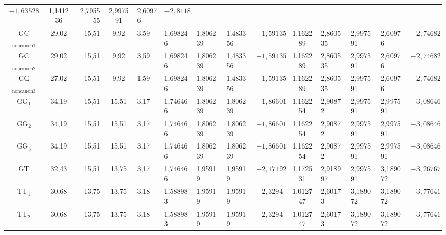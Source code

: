 \begin{table}
{\begin{sideways}
\begin{tabular}{|c|c|r|c|l|l|l|l|l|c|l|l|l|l|}
$-1{,}63528$&1,141236&2,795555&2,997591&2,60976&$-2{,}8118$\\


GC$_{\mathrm{noncanon1}}$&29,02&15,51&\hphantom{9}9,92&3,59&1,698246&1,806239&1,483356&


$-1{,}59135$&1,162289&2,860535&2,997591&2,60976&$-2{,}74682$\\


GC$_{\mathrm{noncanon2}}$&29,02&15,51&\hphantom{9}9,92&3,59&1,698246&1,806239&1,483356&


$-1{,}59135$&1,162289&2,860535&2,997591&2,60976&$-2{,}74682$\\


GС$_{\mathrm{noncanon3}}$&27,02&15,51&\hphantom{9}9,92&1,59&1,698246&1,806239&1,483356&


$-1{,}59135$&1,162289&2,860535&2,997591&2,60976&$-2{,}74682$\\


GG$_1$&34,19&15,51&15,51&3,17&1,746466&1,806239&1,806239&


$-1{,}86601$&1,162254&2,90872&2,997591&2,997591&$-3{,}08646$\\


GG$_2$&34,19&15,51&15,51&3,17&1,746466&1,806239&1,806239&


$-1{,}86601$&1,162254&2,90872&2,997591&2,997591&$-3{,}08646$\\


GG$_3$&34,19&15,51&15,51&3,17&1,746466&1,806239&1,806239&


$-1{,}86601$&1,162254&2,90872&2,997591&2,997591&$-3{,}08646$\\


GT&32,43&15,51&13,75&3,17&1,746466&1,95919&1,95919&$-


2{,}17192$&1,172531&2,918997&2,997591&3,189072&$-3{,}26767$\\


TT$_1$&30,68&13,75&13,75&3,18&1,588983&1,95919&1,95919&


$-2{,}3294$&1,012747&2,60173&3,189072&3,189072&$-3{,}77641$\\


TT$_2$&30,68&13,75&13,75&3,18&1,588983&1,95919&1,95919&


$-2{,}3294$&1,012747&2,60173&3,189072&3,189072&$-3{,}77641$\\


\hline


\end{tabular}


\end{sideways}


}


\end{table}





